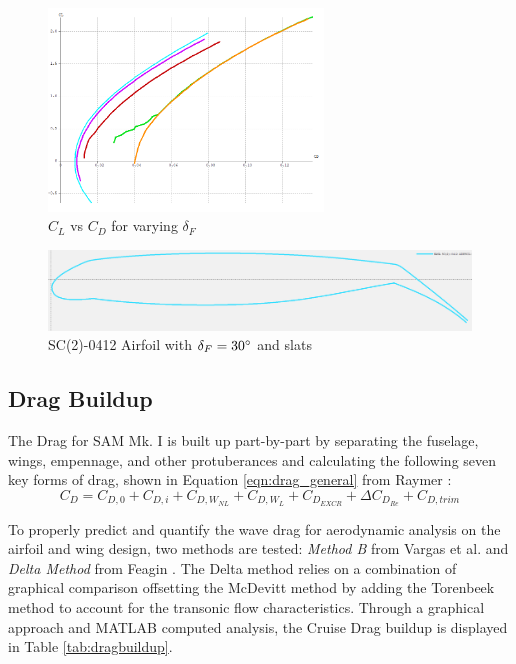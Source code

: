 \begin{figure}[!h]
    \centering
    \includegraphics[width=0.65\textwidth]{Photos/aero/CL_o_CD.png}
    \caption{$C_L$ vs $C_D$ for varying $\delta_F$}
    \label{fig:clcdhigh}
\end{figure}

\begin{figure}[!h]
    \centering
    \includegraphics[width=\textwidth]{Photos/aero/sc0412flapped.png}
    \caption{SC(2)-0412 Airfoil with $\delta_F = 30\degree$ and slats}
    \label{fig:highlift}
\end{figure}

\clearpage
\subsection{Drag Buildup}
The Drag for SAM Mk. I is built up part-by-part by separating the fuselage, wings, empennage, and other protuberances and calculating the following seven key forms of drag, shown in Equation \ref{eqn:drag_general} from Raymer \cite{raymer}:
\begin{equation}\label{eqn:drag_general}
    C_D = C_{D,0} + C_{D,i} + C_{D,W_{NL}} + C_{D,W_{L}} + C_{D_{EXCR}} + \Delta C_{D_{Re}} + C_{D,trim}
\end{equation}

To properly predict and quantify the wave drag for aerodynamic analysis on the airfoil and wing design, two methods are tested: \textit{Method B} from Vargas et al. \cite{vargas} and \textit{Delta Method} from Feagin \cite{deltaMethod}.  The Delta method relies on a combination of graphical comparison offsetting the McDevitt method \cite{mcdevitt} by adding the Torenbeek method \cite{torenbeek} to account for the transonic flow characteristics.  Through a graphical approach and MATLAB computed analysis, the Cruise Drag buildup is displayed in Table \ref{tab:dragbuildup}.

